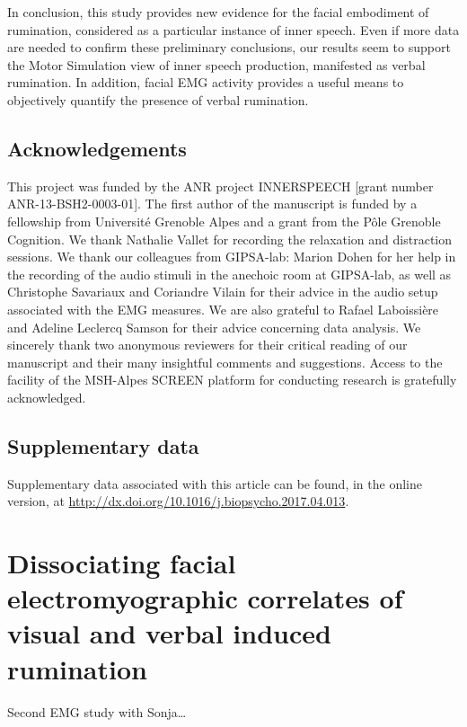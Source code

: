 \documentclass[12pt,]{book}
\begin{document}
In conclusion, this study provides new evidence for the facial
embodiment of rumination, considered as a particular instance of inner
speech. Even if more data are needed to confirm these preliminary
conclusions, our results seem to support the Motor Simulation view of
inner speech production, manifested as verbal rumination. In addition,
facial EMG activity provides a useful means to objectively quantify the
presence of verbal rumination.

\section{Acknowledgements}\label{acknowledgements}

This project was funded by the ANR project INNERSPEECH {[}grant number
ANR-13-BSH2-0003-01{]}. The first author of the manuscript is funded by
a fellowship from Université Grenoble Alpes and a grant from the Pôle
Grenoble Cognition. We thank Nathalie Vallet for recording the
relaxation and distraction sessions. We thank our colleagues from
GIPSA-lab: Marion Dohen for her help in the recording of the audio
stimuli in the anechoic room at GIPSA-lab, as well as Christophe
Savariaux and Coriandre Vilain for their advice in the audio setup
associated with the EMG measures. We are also grateful to Rafael
Laboissière and Adeline Leclercq Samson for their advice concerning data
analysis. We sincerely thank two anonymous reviewers for their critical
reading of our manuscript and their many insightful comments and
suggestions. Access to the facility of the MSH-Alpes SCREEN platform for
conducting research is gratefully acknowledged.

\section{Supplementary data}\label{supplementary-data}

Supplementary data associated with this article can be found, in the
online version, at
\url{http://dx.doi.org/10.1016/j.biopsycho.2017.04.013}.

\chapter{Dissociating facial electromyographic correlates of visual and
verbal induced
rumination}\label{dissociating-facial-electromyographic-correlates-of-visual-and-verbal-induced-rumination}

Second EMG study with Sonja\ldots{}
\end{document}
